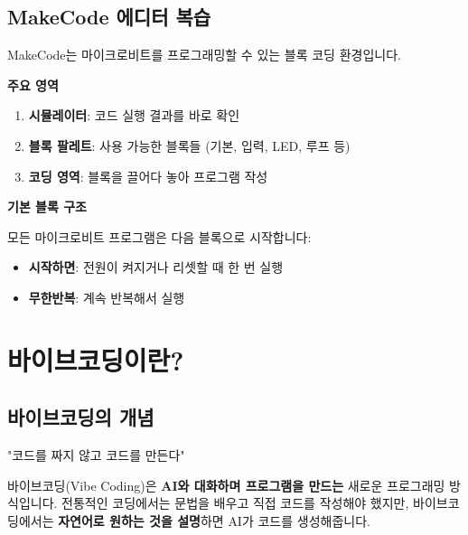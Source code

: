 \documentclass[11pt, a4paper]{article}
\begin{document}
\subsection{MakeCode 에디터 복습}

MakeCode는 마이크로비트를 프로그래밍할 수 있는 블록 코딩 환경입니다.

\textbf{주요 영역}
\begin{enumerate}
  \item \textbf{시뮬레이터}: 코드 실행 결과를 바로 확인
  \item \textbf{블록 팔레트}: 사용 가능한 블록들 (기본, 입력, LED, 루프 등)
  \item \textbf{코딩 영역}: 블록을 끌어다 놓아 프로그램 작성
\end{enumerate}

\begin{keypoint}
\textbf{기본 블록 구조}

모든 마이크로비트 프로그램은 다음 블록으로 시작합니다:
\begin{itemize}
  \item \textbf{시작하면}: 전원이 켜지거나 리셋할 때 한 번 실행
  \item \textbf{무한반복}: 계속 반복해서 실행
\end{itemize}
\end{keypoint}

\newpage

\section{바이브코딩이란?}

\subsection{바이브코딩의 개념}

\begin{tcolorbox}[enhanced, colback=blue!10, colframe=mainblue, 
                  arc=5mm, fontupper=\Large\bfseries, center title]
"코드를 짜지 않고 코드를 만든다"
\end{tcolorbox}

\vspace{1em}

바이브코딩(Vibe Coding)은 \textbf{AI와 대화하며 프로그램을 만드는} 새로운 프로그래밍 방식입니다. 전통적인 코딩에서는 문법을 배우고 직접 코드를 작성해야 했지만, 바이브코딩에서는 \textbf{자연어로 원하는 것을 설명}하면 AI가 코드를 생성해줍니다.
\end{document}
